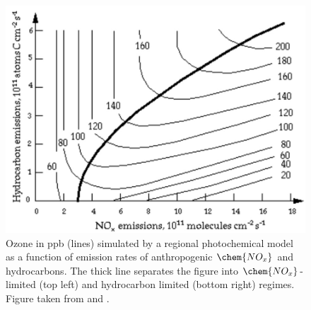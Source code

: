 \begin{figure}
    \centering
    \includegraphics[width=0.7\linewidth]{Chapter2_Theory/images/highNOxlowNOx.jpeg}
    \caption{Ozone in ppb (lines) simulated by a regional photochemical model as a function of emission rates of anthropogenic $\chem{NO_x}$ and hydrocarbons. The thick line separates the figure into $\chem{NO_x}$-limited (top left) and hydrocarbon limited (bottom right) regimes. Figure taken from \cite{Jacob1999} and \cite{Sillmann1990}.}
    \label{fig:highnoxlownox}
\end{figure}
